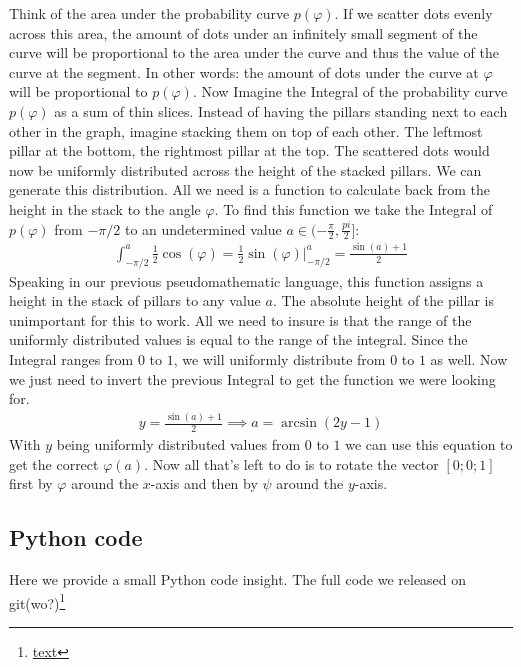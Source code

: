 \documentclass[12pt,a4paper,oneside,english]{article}
\begin{document}
Think of the area under the probability curve $p(\varphi)$. If we scatter dots evenly across this area, the amount of dots under an infinitely small segment of the curve will be proportional to the area under the curve and thus the value of the curve at the segment. In other words: the amount of dots under the curve at $\varphi$ will be proportional to $p(\varphi)$. Now Imagine the Integral of the probability curve $p(\varphi)$ as a sum of thin slices. Instead of having the pillars standing next to each other in the graph, imagine stacking them on top of each other. The leftmost pillar at the bottom, the rightmost pillar at the top. The scattered dots would now be uniformly distributed across the height of the stacked pillars. We can generate this distribution. All we need is a function to calculate back from the height in the stack to the angle $\varphi$.
To find this function we take the Integral of $p(\varphi)$ from $-\pi/2$ to an undetermined value $a \in (-\frac{\pi}{2}, \frac{pi}{2}]$:
\begin{align}
\int_{-\pi/2}^{a}\frac{1}{2}\cos(\varphi) = \frac{1}{2} \sin(\varphi) \bigg|_{-\pi/2}^{a} = \frac{\sin(a)+1}{2}
\end{align}
Speaking in our previous pseudomathematic language, this function assigns a height in the stack of pillars to any value $a$. The absolute height of the pillar is unimportant for this to work. All we need to insure is that the range of the uniformly distributed values is equal to the range of the integral. Since the Integral ranges from $0$ to $1$, we will uniformly distribute from $0$ to $1$ as well. Now we just need to invert the previous Integral to get the function we were looking for.
\begin{align}
y = \frac{\sin(a)+1}{2} \implies a=\arcsin(2y-1)
\end{align}
With $y$ being uniformly distributed values from $0$ to $1$ we can use this equation to get the correct $\varphi(a)$. Now all that’s left to do is to rotate the vector $[0;0;1]$ first by $\varphi$ around the $x$-axis and then by $\psi$ around the $y$-axis.
\subsection{Python code}
Here we provide a small Python code insight. The full code we released on git(wo?)\footnote{\href{gitlink}{text}}
	\footnotesize
\end{document}
